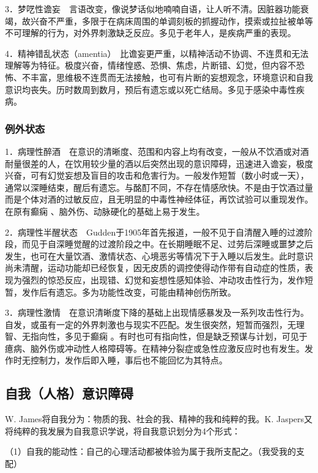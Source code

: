 3．梦呓性谵妄　言语改变，像说梦话似地喃喃自语，让人听不清。因脏器功能衰竭，故兴奋不严重，多限于在病床周围的单调刻板的抓握动作，摸索或拉扯被单等不可理解的行为，对外界刺激缺乏反应。多见于老年人，是疾病严重的表现。

4．精神错乱状态（amentia）　比谵妄更严重，以精神活动不协调、不连贯和无法理解等为特征。极度兴奋，情绪惶惑、恐惧、焦虑，片断错、幻觉，但内容不恐怖、不丰富，思维极不连贯而无法接触，也可有片断的妄想观念，环境意识和自我意识均丧失。历时数周到数月，预后有遗忘或以死亡结局。多见于感染中毒性疾病。

\subsubsection{例外状态}

1．病理性醉酒　在意识的清晰度、范围和内容上均有改变，一般从不饮酒或对酒耐量很差的人，在饮用较少量的酒以后突然出现的意识障碍，迅速进入谵妄，极度兴奋，可有幻觉妄想及盲目的攻击和危害行为。一般发作短暂（数小时或一天），通常以深睡结束，醒后有遗忘。与酩酊不同，不存在情感欣快。不是由于饮酒过量而是个体对酒的过敏反应，且无明显的中毒性神经体征，再饮试验可以重现发作。在原有癫痫
、脑外伤、动脉硬化的基础上易于发生。

2．病理性半醒状态　Gudden于1905年首先报道，一般不见于自清醒入睡的过渡阶段，而见于自深睡觉醒的过渡阶段之中。在长期睡眠不足、过劳后深睡或噩梦之后发生，也可在大量饮酒、激情状态、心境恶劣等情况下于入睡以后发生。此时意识尚未清醒，运动功能却已经恢复，因无皮质的调控使得动作带有自动症的性质，表现为强烈的惊恐反应，出现错、幻觉和妄想性感知体验、冲动攻击性行为，发作短暂，发作后有遗忘。多为功能性改变，可能由精神创伤所致。

3．病理性激情　在意识清晰度下降的基础上出现情感暴发及一系列攻击性行为。自发，或虽有一定的外界刺激也与现实不匹配。发生很突然，短暂而强烈，无理智、无指向性，多见于癫痫
。有时也可有指向性，但是缺乏预谋与计划，可见于癔病、脑外伤或冲动性人格障碍等。在精神分裂症或急性应激反应时也有发生。发作时无控制力，发作后即入睡，事后也不能回忆为其特点。

\subsection{自我（人格）意识障碍}

W. James将自我分为：物质的我、社会的我、精神的我和纯粹的我。K.
Jaspers又将纯粹的我发展为自我意识学说，将自我意识划分为4个形式：

（1）自我的能动性：自己的心理活动都被体验为属于我所支配之。（我受我的支配）

